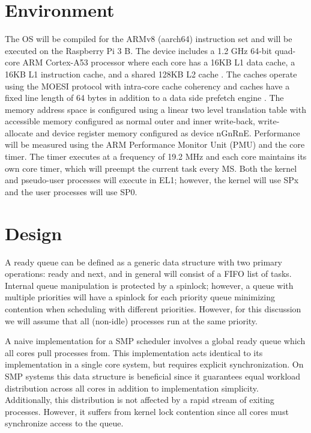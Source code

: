 \documentclass[11pt]{article}
\begin{document}
\section{Environment}
\label{sec:environment}
The OS will be compiled for the ARMv8 (aarch64) instruction set and will be executed on the Raspberry Pi 3 B.  The device includes a 1.2 GHz 64-bit quad-core ARM Cortex-A53 processor where each core has a 16KB L1 data cache, a 16KB L1 instruction cache, and a shared 128KB L2 cache \cite{arm-l1-about} \cite{arm-l2-about}.  The caches operate using the MOESI protocol with intra-core cache coherency and caches have a fixed line length of 64 bytes in addition to a data side prefetch engine \cite{arm-l1-coherency} \cite{arm-l1-prefetch}.  The memory address space is configured using a linear two level translation table with accessible memory configured as normal outer and inner write-back, write-allocate and device register memory configured as device nGnRnE.  Performance will be measured using the ARM Performance Monitor Unit (PMU) and the core timer.  The timer executes at a frequency of 19.2 MHz \cite{bcm2386} and each core maintains its own core timer, which will preempt the current task every MS.  Both the kernel and pseudo-user processes will execute in EL1; however, the kernel will use SPx and the user processes will use SP0.

\section{Design}
\label{sec:design}
A ready queue can be defined as a generic data structure with two primary operations: ready and next, and in general will consist of a FIFO list of tasks.  Internal queue manipulation is protected by a spinlock; however, a queue with multiple priorities will have a spinlock for each priority queue minimizing contention when scheduling with different priorities.  However, for this discussion we will assume that all (non-idle) processes run at the same priority.

A naive implementation for a SMP scheduler involves a global ready queue which all cores pull processes from.  This implementation acts identical to its implementation in a single core system, but requires explicit synchronization.  On SMP systems this data structure is beneficial since it guarantees equal workload distribution across all cores in addition to implementation simplicity.  Additionally, this distribution is not affected by a rapid stream of exiting processes.  However, it suffers from kernel lock contention since all cores must synchronize access to the queue.
\end{document}
